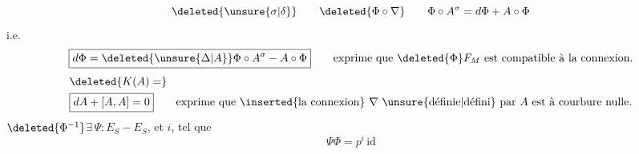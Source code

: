 \[
\deleted{\unsure{\sigma|\delta}}\qquad\deleted{\Phi\circ\nabla}\qquad \Phi\circ A^\sigma=d\Phi+A\circ\Phi
\]
i.e.
\[
\boxed{d\Phi=\deleted{\unsure{\Delta|A}}\Phi\circ A^\sigma-A\circ\Phi}\qquad
\text{exprime que $\deleted{\Phi}F_M$ est compatible à la connexion.}
\]
\[
\begin{aligned}
&\deleted{K(A)=}\\
&\boxed{dA+[A,A]=0}\qquad\text{exprime que \inserted{la connexion} $\nabla$ \unsure{définie|défini} par $A$ est à courbure nulle.}
\end{aligned}
\]
$\deleted{\Phi^{-1}}$\quad $\exists\,\Psi:E_S\mathbin{-}E_S$, et $i$, tel que
\[
\boxed{\Psi\Phi=p^i\,\mathrm{id}}
\]
